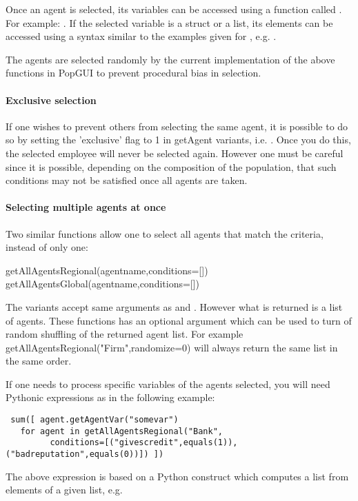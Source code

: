 \documentclass{article}
\begin{document}
Once an agent is selected, its variables can be accessed using a function called . For example: . If the selected variable is a struct or a list, its elements can be accessed using a syntax similar to the examples given for , e.g. .

The agents are selected randomly by the current implementation of the above functions in PopGUI to prevent procedural bias in selection.

\paragraph{Exclusive selection}
If one wishes to prevent others from selecting the same agent, it is possible to do so by setting the 'exclusive' flag to 1 in getAgent variants, i.e. . Once you do this, the selected employee will never be selected again. However one must be careful since it is possible, depending on the composition of the population, that such conditions may not be satisfied once all agents are taken.

\paragraph{Selecting multiple agents at once}
Two similar functions allow one to select all agents that match the criteria, instead of only one:
\begin{description}
\item[{getAllAgentsRegional(agentname,conditions=[])}]
\item[{getAllAgentsGlobal(agentname,conditions=[])}]
\end{description}
The variants accept same arguments as  and . However what is returned is a list of agents. These functions has an optional argument which can be used to turn of random shuffling of the returned agent list. For example getAllAgentsRegional("Firm",randomize=0) will always return the same list in the same order.
 

If one needs to process specific variables of the agents selected, you will need Pythonic expressions as in the following example:\\
\begin{verbatim}
 sum([ agent.getAgentVar("somevar") 
   for agent in getAllAgentsRegional("Bank", 
         conditions=[("givescredit",equals(1)),("badreputation",equals(0))]) ])
\end{verbatim}
The above expression is based on a Python construct which computes a list from elements of a given list, e.g. \example{[i*i for i in [1,2,3]]}
\end{document}
